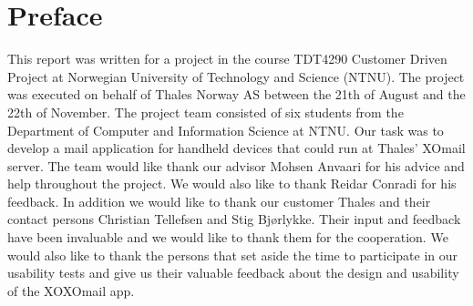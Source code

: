 \chapter*{Preface}

This report was written for a project in the course TDT4290 Customer Driven Project at Norwegian University of Technology and Science (NTNU). The project was executed on behalf of Thales Norway AS between the 21th of August and the 22th of November.
\newline
\newline
The project team consisted of six students from the Department of Computer and Information Science at NTNU. Our task was to develop a mail application for handheld devices that could run at Thales' XOmail server.
\newline
\newline
The team would like thank our advisor Mohsen Anvaari for his advice and help throughout the project. We would also like to thank Reidar Conradi for his feedback. 
\newline
\newline
In addition we would like to thank our customer Thales and their contact persons Christian Tellefsen and Stig Bjørlykke. Their input and feedback have been invaluable and we would like to thank them for the cooperation. 
\newline
\newline
We would also like to thank the persons that set aside the time to participate in our usability tests and give us their valuable feedback about the design and usability of the XOXOmail app.
